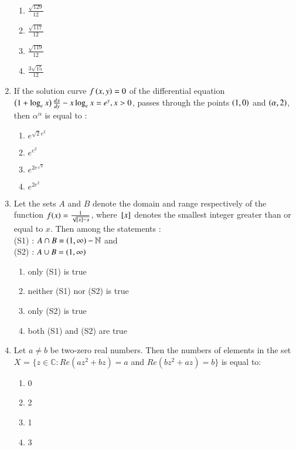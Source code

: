 \documentclass[journal,12pt,onecolumn]{IEEEtran}
\theoremstyle{remark}
\begin{document}
\begin{enumerate}
\begin{enumerate}
        \item $\frac{\sqrt{129}}{12}$ 
        \item $\frac{\sqrt{117}}{12}$
 \item $\frac{\sqrt{119}}{12}$ 
        \item $\frac{3\sqrt{15}}{12}$
\end{enumerate}
\item If the solution curve $f\left(x, y\right) = 0$ of the differential equation $\left(1+ \log_e x\right)\frac{dx}{dy} - x \log_e x =e^y, x>0$, passes through the points $\left(1, 0\right)$ and $\left(\alpha,2\right)$, then $\alpha ^{\alpha}$ is equal to :
        \begin{enumerate}
                \item $e^{\sqrt{2}e^2}$
                \item $e^{e^2}$
                \item $e^{2e^{\sqrt{2}}}$ 
        \item $e^{2e^2}$    
\end{enumerate}
\item Let the sets $A$ and $B$ denote the domain and range respectively of the function $f(x)=\frac{1}{\sqrt{{}\left[x\right]-x}}$, where ${}\left[x\right]$ denotes the smallest integer greater than or equal to $x$. Then among the statements :\\
	(S1) : $A \cap B = \left(1,\infty\right) - \mathbb{N}$ and \\
(S2) : $A \cup B = \left(1,\infty\right)$
 \begin{enumerate}
                \item only (S1) is true
                \item neither (S1) nor (S2) is true
                \item only (S2) is true
                \item both (S1) and (S2) are true
\end{enumerate}
\item Let $a \neq b$ be two-zero real numbers. Then the numbers of elements in the set \\ $X$ = $\{$$z \in \mathbb{C}:Re(az^2+bz)=a$  and $Re(bz^2+az)=b$$\}$ is equal to:
\begin{enumerate}
                \item 0
                \item 2
                \item 1
                \item 3
\end{enumerate}
 \end{enumerate}
\end{document}
